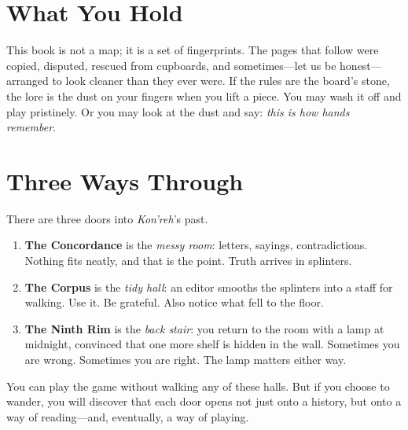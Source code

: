 \documentclass[11pt]{article}
\begin{document}
\onehalfspacing

\section*{What You Hold}
This book is not a map; it is a set of fingerprints. The pages that follow were copied, disputed, rescued from cupboards, and sometimes---let us be honest---arranged to look cleaner than they ever were. If the rules are the board's stone, the lore is the dust on your fingers when you lift a piece. You may wash it off and play pristinely. Or you may look at the dust and say: \emph{this is how hands remember}.

\section*{Three Ways Through}
There are three doors into \emph{Kon'reh}'s past.

\begin{enumerate}[leftmargin=\textit{,label=\arabic})]
  \item \textbf{The Concordance} is the \emph{messy room}: letters, sayings, contradictions. Nothing fits neatly, and that is the point. Truth arrives in splinters.
  \item \textbf{The Corpus} is the \emph{tidy hall}: an editor smooths the splinters into a staff for walking. Use it. Be grateful. Also notice what fell to the floor.
  \item \textbf{The Ninth Rim} is the \emph{back stair}: you return to the room with a lamp at midnight, convinced that one more shelf is hidden in the wall. Sometimes you are wrong. Sometimes you are right. The lamp matters either way.
\end{enumerate}

You can play the game without walking any of these halls. But if you choose to wander, you will discover that each door opens not just onto a history, but onto a way of reading---and, eventually, a way of playing.
\end{document}
